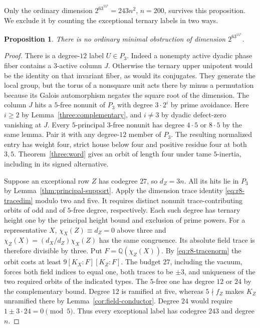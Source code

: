 \documentclass[11pt,a4paper]{article}
\numberwithin{equation}{section}
\newtheorem{proposition}[theorem]{Proposition}
\theoremstyle{remark}
\begin{document}
Only the ordinary dimension $2^63^55^4=243n^2$, $n=200$, survives
this proposition. We exclude it by counting the exceptional ternary
labels in two ways.

\begin{proposition}
There is no ordinary minimal obstruction of dimension $2^63^55^4$.
\end{proposition}
\begin{proof}
There is a degree-$12$ label $U\in P_3$. Indeed a nonempty active
dyadic phase fiber contains a $3$-active column $J$. Otherwise
the ternary upper unipotent would be the identity on that invariant
fiber, as would its conjugates. They generate the local group, but
the torus of a nonsquare unit acts there by minus a permutation because
its Galois automorphism negates the square root of the dimension. The column
$J$ hits a $5$-free nonunit of $P_3$ with degree $3\cdot2^i$ by
prime avoidance. Here $i\ge2$ by Lemma~\ref{three:complementary},
and $i\ne3$ by dyadic defect-zero vanishing at $J$.
Every $5$-principal $3$-free nonunit has degree $4\cdot5$ or
$8\cdot5$ by the same lemma. Pair it with any degree-$12$ member
of $P_3$. The resulting normalized entry has weight four, strict
house below four and positive residue four at both $3,5$.
Theorem~\ref{three:word} gives an orbit of length four under tame
$5$-inertia, including in its signed alternative.

Suppose an exceptional row $Z$ has codegree $27$, so $d_Z=3n$.
All its hits lie in $P_3$ by Lemma~\ref{thm:principal-support}.
Apply the dimension trace identity \eqref{eq:r8-tracedim} modulo
two and five. It requires distinct nonunit trace-contributing
orbits of odd and of $5$-free degree, respectively. Each such
degree has ternary height one by the principal height bound and
exclusion of prime powers. For a representative $X$,
$\chi_X(Z)\equiv d_Z=0$ above three and
$\chi_Z(X)=(d_X/d_Z)\chi_X(Z)$ has the same congruence.
Its absolute field trace is therefore divisible by three. Put
$F=\mathbb Q(\chi_Z(X))$. By \eqref{eq:r8-tracenorm} the orbit
costs at least $9[K_X:F][K_Z:F]$. The budget $27$, including the
vacuum, forces both field indices to equal one, both traces to be
$\pm3$, and uniqueness of the two required orbits of the indicated
types. The $5$-free one has degree $12$ or $24$ by the complementary
bound. Degree $12$ is ramified at five, whereas $5\nmid f_Z$ makes
$K_Z$ unramified there by Lemma~\ref{cor:field-conductor}. Degree $24$ would require $1\pm3\cdot24=0\pmod5$.
Thus every exceptional label has codegree $243$ and degree $n$.


\end{proof}
\end{document}
